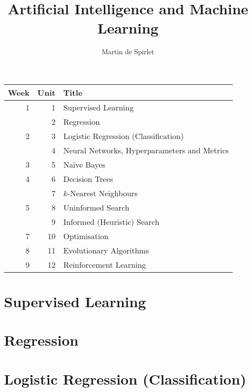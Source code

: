 \documentclass[
  11pt,
  a4paper,
]{article}
\title{Artificial Intelligence and Machine Learning}
\author{Martin de Spirlet}
\date{}
\begin{document}

\maketitle

\vspace*{\fill}

\begin{table}[htp]
  \centering
  \begin{tabular}{rrl}
    \toprule
    Week & Unit & Title \\
    \midrule
    1 &  1 & Supervised Learning \\
      &  2 & Regression \\ [1ex]
    2 &  3 & Logistic Regression (Classification) \\
      &  4 & Neural Networks, Hyperparameters and Metrics \\ [1ex]
    3 &  5 & Na\"{i}ve Bayes \\ [1ex]
    4 &  6 & Decision Trees \\
      &  7 & \( k \)-Nearest Neighbours \\ [1ex]
    5 &  8 & Uninformed Search \\
      &  9 & Informed (Heuristic) Search \\ [1ex]
    7 & 10 & Optimisation \\ [1ex]
    8 & 11 & Evolutionary Algorithms \\ [1ex]
    9 & 12 & Reinforcement Learning \\
    \bottomrule
  \end{tabular}
\end{table}

\vspace*{\fill}
\addvspace{1in}

\clearpage


\section{Supervised Learning}


\section{Regression}


\section{Logistic Regression (Classification)}

\end{document}

